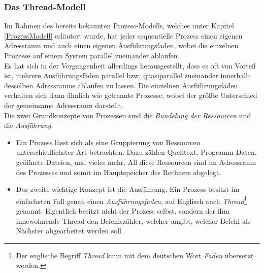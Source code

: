 			\subsubsection{Das Thread-Modell}
				\label{ThreadModell}

				Im Rahmen des bereits bekannten Prozess-Modells, welches unter Kapitel \ref{ProzessModell} erläutert wurde, hat jeder sequentielle Prozess einen eigenen Adressraum und auch einen eigenen Ausführungsfaden, wobei die einzelnen Prozesse auf einem System parallel zueinander ablaufen.\\
				Es hat sich in der Vergangenheit allerdings herausgestellt, dass es oft von Vorteil ist, mehrere Ausführungsfäden parallel bzw. quasiparallel zueinander innerhalb desselben Adressraums ablaufen zu lassen. Die einzelnen Ausführungsfäden verhalten sich dann ähnlich wie getrennte Prozesse, wobei der größte Unterschied der gemeinsame Adressraum darstellt.\\
				Die zwei Grundkonzepte von Prozessen sind die \textit{Bündelung der Ressourcen} und die \textit{Ausführung}.
				
				\begin{itemize}
					\item
						Ein Prozess lässt sich als eine Gruppierung von Ressourcen unterschiedlichster Art betrachten. Dazu zählen Quelltext, Programm-Daten, geöffnete Dateien, und vieles mehr. All diese Ressourcen sind im Adressraum des Prozesses und somit im Hauptspeicher des Rechners abgelegt.
					\item
						Das zweite wichtige Konzept ist die Ausführung. Ein Prozess besitzt im einfachsten Fall genau einen \textit{Ausführungsfaden}, auf Englisch auch \textit{Thread}\footnote{Der englische Begriff \textit{Thread} kann mit dem deutschen Wort \textit{Faden} übersetzt werden.} genannt. Eigentlich besitzt nicht der Prozess selbst, sondern der ihm innewohnende Thread den Befehlszähler, welcher angibt, welcher Befehl als Nächster abgearbeitet werden soll.
				\end{itemize}
			
